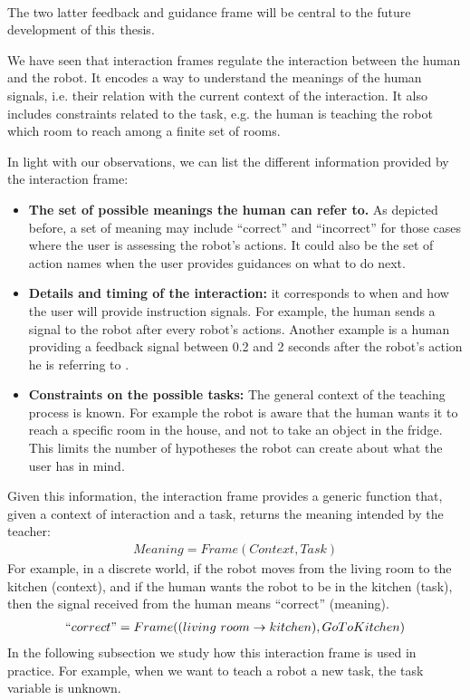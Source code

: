 \paragraph{} The two latter feedback and guidance frame will be central to the future development of this thesis. 

\transition

We have seen that interaction frames regulate the interaction between the human and the robot. It encodes a way to understand the meanings of the human signals, i.e. their relation with the current context of the interaction. It also includes constraints related to the task, e.g. the human is teaching the robot which room to reach among a finite set of rooms.

In light with our observations, we can list the different information provided by the interaction frame:

\begin{itemize}

\item \textbf{The set of possible meanings the human can refer to.} As depicted before, a set of meaning may include ``correct'' and ``incorrect'' for those cases where the user is assessing the robot's actions. It could also be the set of action names when the user provides guidances on what to do next.

\item \textbf{Details and timing of the interaction:} it corresponds to when and how the user will provide instruction signals. For example, the human sends a signal to the robot after every robot's actions. Another example is a human providing a feedback signal between 0.2 and 2 seconds after the robot's action he is referring to \cite{knox2009interactively}.

\item \textbf{Constraints on the possible tasks:} The general context of the teaching process is known. For example the robot is aware that the human wants it to reach a specific room in the house, and not to take an object in the fridge. This limits the number of hypotheses the robot can create about what the user has in mind.

\end{itemize}

Given this information, the interaction frame provides a generic function that, given a context of interaction and a task, returns the meaning intended by the teacher:
%
\begin{eqnarray}
Meaning = Frame(Context, Task) \nonumber
\end{eqnarray}
%
For example, in a discrete world, if the robot moves from the living room to the kitchen (context), and if the human wants the robot to be in the kitchen (task), then the signal received from the human means ``correct'' (meaning). 
%
\begin{eqnarray}
``correct" = Frame((living~room \rightarrow kitchen), Go To Kitchen) \nonumber
\end{eqnarray}
%
In the following subsection we study how this interaction frame is used in practice. For example, when we want to teach a robot a new task, the task variable is unknown.

